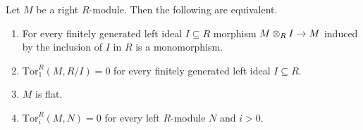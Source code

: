 \begin{proposition}\label{proposition:homologicalflatness}
Let $M$ be a right $R$-module. Then the following are equivalent.
\begin{enumerate}[label=\emph{\textbf{(\roman*)}}, leftmargin=3.0em]
\item For every finitely generated left ideal $I\subseteq R$ morphism $M\otimes_RI\rightarrow M$ induced by the inclusion of $I$ in $R$ is a monomorphism.
\item $\mathrm{Tor}^R_1(M,R/I)=0$ for every finitely generated left ideal $I\subseteq R$.
\item $M$ is flat.
\item $\mathrm{Tor}^R_i(M,N)=0$ for every left $R$-module $N$ and $i>0$.
\end{enumerate}
\end{proposition}
